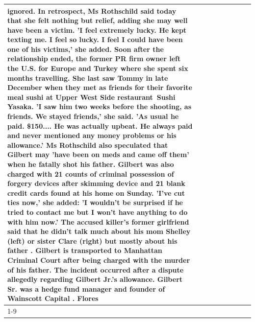 \begin{table}[H]
\begin{tabular}{lllrlllll}
ignored. In retrospect, Ms Rothschild said today that she felt nothing but relief, adding she may well have been a victim. 'I feel extremely lucky. He kept texting me. I feel so lucky. I feel I could have been one of his victims,' she added. Soon after the relationship ended, the former PR firm owner left the U.S. for Europe and Turkey where she spent six months  travelling. She last saw Tommy in late December when they met as friends for their favorite meal sushi at Upper West Side restaurant Sushi Yasaka. 'I saw him two weeks before the shooting, as friends. We stayed friends,' she said. 'As usual he paid. \$150.... He was actually upbeat. He always paid and never mentioned any money problems or his allowance.' Ms Rothschild also speculated that Gilbert may 'have been on meds and came off them' when he fatally shot his father. Gilbert was also charged with 21 counts of criminal possession of forgery devices after skimming device and 21 blank credit cards found at his home on Sunday. 'I've cut ties now,' she added: 'I wouldn’t be surprised if he tried to contact me but I won’t have anything to do with him now.' The accused killer's former girlfriend said that he didn't talk much about his mom Shelley (left) or sister Clare (right) but mostly about his father . Gilbert is transported to Manhattan Criminal Court  after being charged with the murder of his father. The incident occurred after a dispute allegedly regarding Gilbert Jr.'s allowance. Gilbert Sr. was a hedge fund manager and founder of Wainscott Capital . Flores \\
\cline{1-9}

\end{tabular}
\end{table}
